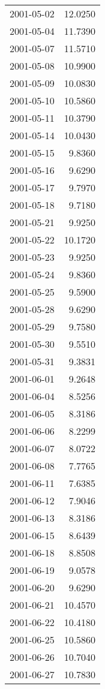 \begin{tabular}{lr}
2001-05-02 &     12.0250 \\
2001-05-04 &     11.7390 \\
2001-05-07 &     11.5710 \\
2001-05-08 &     10.9900 \\
2001-05-09 &     10.0830 \\
2001-05-10 &     10.5860 \\
2001-05-11 &     10.3790 \\
2001-05-14 &     10.0430 \\
2001-05-15 &      9.8360 \\
2001-05-16 &      9.6290 \\
2001-05-17 &      9.7970 \\
2001-05-18 &      9.7180 \\
2001-05-21 &      9.9250 \\
2001-05-22 &     10.1720 \\
2001-05-23 &      9.9250 \\
2001-05-24 &      9.8360 \\
2001-05-25 &      9.5900 \\
2001-05-28 &      9.6290 \\
2001-05-29 &      9.7580 \\
2001-05-30 &      9.5510 \\
2001-05-31 &      9.3831 \\
2001-06-01 &      9.2648 \\
2001-06-04 &      8.5256 \\
2001-06-05 &      8.3186 \\
2001-06-06 &      8.2299 \\
2001-06-07 &      8.0722 \\
2001-06-08 &      7.7765 \\
2001-06-11 &      7.6385 \\
2001-06-12 &      7.9046 \\
2001-06-13 &      8.3186 \\
2001-06-15 &      8.6439 \\
2001-06-18 &      8.8508 \\
2001-06-19 &      9.0578 \\
2001-06-20 &      9.6290 \\
2001-06-21 &     10.4570 \\
2001-06-22 &     10.4180 \\
2001-06-25 &     10.5860 \\
2001-06-26 &     10.7040 \\
2001-06-27 &     10.7830 \\

\end{tabular}
